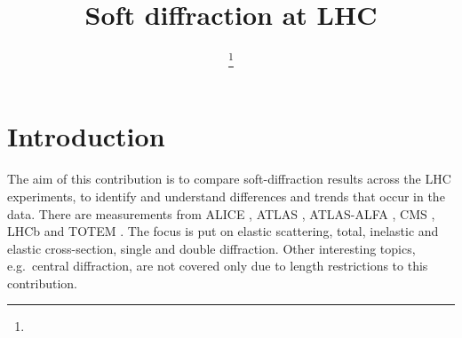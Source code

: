\documentclass{webofc}
\begin{document}
\title{Soft diffraction at LHC}

\author{%
	 \fnsep\thanks{}
}



\maketitle


\section{Introduction}
\label{s:intro}

The aim of this contribution is to compare soft-diffraction results across the LHC experiments, to identify and understand differences and trends that occur in the data. There are measurements from ALICE \cite{alice}, ATLAS \cite{atlas}, ATLAS-ALFA \cite{alfa-si-el-7tev}, CMS \cite{cms}, LHCb \cite{lhcb} and TOTEM \cite{totem}. The focus is put on elastic scattering, total, inelastic and elastic cross-section, single and double diffraction. Other interesting topics, e.g.~central diffraction, are not covered only due to length restrictions to this contribution.


\end{document}
